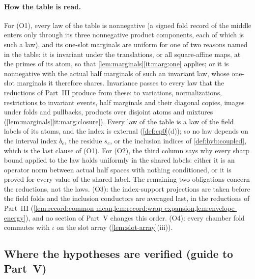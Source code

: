 \paragraph{How the table is read.}
For (O1), every law of the table is nonnegative (a signed fold record of the
middle enters only through its three nonnegative product components, each of
which is such a law), and its one-slot marginals are uniform for one of two
reasons named in the table: it is invariant under the translations, or all
square-affine maps, at the primes of its atom, so that
\cref{lem:marginals}\ref{it:marg:one} applies; or it is nonnegative with the
actual half marginals of such an invariant law, whose one-slot marginals it
therefore shares. Invariance passes to every law that the reductions of
Part~III produce from these: to variations, normalizations, restrictions to
invariant events, half marginals and their diagonal copies, images under folds
and pullbacks, products over disjoint atoms and mixtures
(\cref{lem:marginals}\ref{it:marg:closure}). Every law of the table is a law of
the field labels of its atoms, and the index is external (\cref{def:cp0}(d)); so
no law depends on the interval index $b_e$, the residue $s_e$, or the
inclusion indices of \cref{def:hyb:coupled}, which is the last
clause of (O1). For (O2), the third column says why every sharp bound applied
to the law holds uniformly in the shared labels: either it is an operator norm
between actual half spaces with nothing conditioned, or it is proved for every
value of the shared label. The remaining two obligations concern the
reductions, not the laws. (O3): the index-support projections are taken before
the field folds and the inclusion conductors are averaged last, in the
reductions of Part~III (\cref{lem:record:common-mean,lem:record:wrap-expansion,lem:envelope-energy}),
and no section of Part~V changes this order. (O4): every chamber fold commutes
with $\iota$ on the slot array (\cref{lem:slot-array}(iii)).

\subsection{Where the hypotheses are verified (guide to Part~V)}\label{subsec:design-table}

